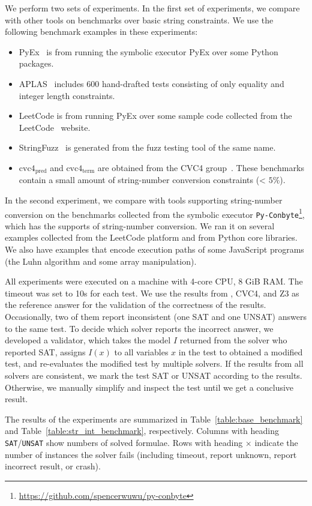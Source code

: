 We perform two sets of experiments. In the first set of experiments, we compare with other tools on benchmarks over basic string constraints. We use the following benchmark examples in these experiments:
\begin{itemize}
	\item PyEx~\cite{pyex} is from running the symbolic executor PyEx over some Python packages.
	\item APLAS~\cite{aplas} includes 600 hand-drafted tests consisting of only equality and integer length constraints.
	\item LeetCode is from running PyEx over some sample code collected from the LeetCode~\cite{LeetCode} website.
	\item StringFuzz~\cite{blotsky2018stringfuzz}  is generated from the fuzz testing tool of the same name.
	\item $\text{cvc4}_{\text{pred}}$ and $\text{cvc4}_{\text{term}}$ are obtained from the CVC4 group~\cite{termEQ}. These benchmarks contain a small amount of string-number conversion constraints (< $5\%$).
\end{itemize}

In the second experiment, we compare with tools supporting string-number conversion on the benchmarks collected from the symbolic executor \texttt{Py-Conbyte}\footnote{\url{https://github.com/spencerwuwu/py-conbyte}}, which has the supports of string-number conversion. We ran it on several examples collected from the LeetCode platform and from Python core libraries. We also have examples that encode execution paths of some JavaScript programs (the Luhn algorithm and some array manipulation).

All experiments were executed on a machine with 4-core CPU, 8 GiB RAM. The timeout was set to 10s for each test.
We use the results from {\tool}, CVC4, and Z3 as the reference answer for the validation of the correctness of the results. Occasionally, two of them report inconsistent (one SAT and one UNSAT) answers to the same test. To decide which solver reports the incorrect answer, we developed a validator, which takes the model $I$ returned from the solver who reported SAT, assigns $I(x)$ to all variables $x$ in the test to obtained a modified test, and re-evaluates the modified test by multiple solvers. If the results from all solvers are consistent, we mark the test SAT or UNSAT according to the results. Otherwise, we manually simplify and inspect the test until we get a conclusive result. 

The results of the experiments are summarized in Table~\ref{table:base_benchmark} and Table~\ref{table:str_int_benchmark}, respectively. Columns with heading \texttt{SAT}/\texttt{UNSAT} show numbers of solved formulae. Rows with heading $\times$ indicate the number of instances the solver fails (including timeout, report unknown, report incorrect result, or crash).


